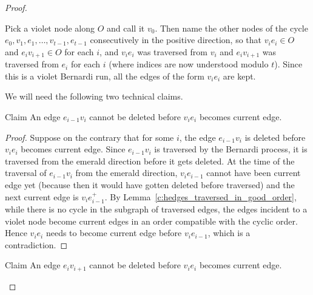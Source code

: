 \documentclass[ALCO,ThmDefs,Unicode,epreuves]{cedram}
\newenvironment{claim}{\begin{enonce}{Claim}}{\end{enonce}}
\begin{document}
\begin{proof}
\begin{center}
\end{center}

Pick a violet node along $O$ and call it $v_0$. Then name the other nodes of the cycle $e_0, v_1, e_1, \dots, v_{t-1}, e_{t-1}$ consecutively in the positive direction, \ie so that $v_ie_i\in O$ and $e_iv_{i+1}\in O$ for each $i$, and $v_ie_i$ was traversed from $v_i$ and $e_iv_{i+1}$ was traversed from $e_i$ for each $i$ (where indices are now understood modulo $t$). Since this is a violet Bernardi run, all the edges of the form $v_ie_i$ are kept.

We will need the following two technical claims.

\begin{claim}\label{c:Ber_cycle_cl0}
An edge $e_{i-1}v_{i}$ cannot be deleted before $v_ie_i$ becomes current edge.
\end{claim}

\begin{proof}
Suppose on the contrary that for some $i$, the edge $e_{i-1}v_{i}$ is deleted before $v_ie_i$ becomes current edge. Since $e_{i-1}v_{i}$ is traversed by the Bernardi process, it is traversed from the emerald direction before it gets deleted. At the time of the traversal of $e_{i-1}v_{i}$ from the emerald direction, $v_ie_{i-1}$ cannot have been current edge yet (because then it would have gotten deleted before traversed) and the next current edge is $v_{i}e_{i-1}^+$. By Lemma~\ref{c:hedges_traversed_in_good_order}, while there is no cycle in the subgraph of traversed edges, the edges incident to a violet node become current edges in an order compatible with the cyclic order. Hence $v_{i}e_ {i}$ needs to become current edge before $v_{i}e_{i-1}$, which is a contradiction.
\end{proof}

\begin{claim}\label{c:Ber_cycle_cl1}
An edge $e_iv_{i+1}$ cannot be deleted before $v_ie_i$ becomes current edge.
\end{claim}


\end{proof}
\end{document}
